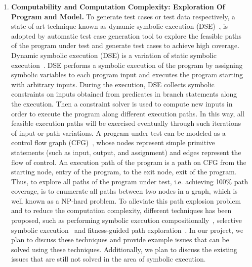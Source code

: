 \documentclass[times, 10pt,onecolumn]{article}
\begin{document}
\begin{enumerate}
\item{\textbf{Computability and Computation Complexity: Exploration Of Program and Model.} To generate test cases or test data respectively, a state-of-art technique known as dynamic symbolic execution (DSE)~\cite{dart,exe,cute}, is adopted by automatic test case generation tool to explore the feasible paths of the program under test and generate test cases to achieve high coverage. Dynamic symbolic execution (DSE) is a variation of static symbolic execution~\cite{static}. DSE performs a symbolic execution of the program by assigning symbolic variables to each program input and executes the program starting with arbitrary inputs. During the execution, DSE collects symbolic constraints on inputs obtained from predicates in branch statements along the execution. Then a constraint solver is used to compute new inputs in order to execute the program along different execution paths. In this way, all feasible execution paths will be exercised eventually through such iterations of input or path variations. A program under test can be modeled as a control flow graph (CFG)~\cite{testbook}, whose nodes represent simple primitive statements (such as input, output, and assignment) and edges represent the flow of control. An execution path of the program is a path on CFG from the starting node, entry of the program, to the exit node, exit of the program. Thus, to explore all paths of the program under test, i.e. achieving 100\% path coverage, is to enumerate all paths between two nodes in a graph, which is well known as a NP-hard problem. To alleviate this path explosion problem and to reduce the computation complexity, different techniques has been proposed, such as performing symbolic execution compositionally~\cite{compositional}, selective symbolic execution~\cite{selective} and fitness-guided path exploration~\cite{fitness}. In our project, we plan to discuss these techniques and provide example issues that can be solved using these techniques. Additionally, we plan to discuss the existing issues that are still not solved in the area of symbolic execution.}
\end{enumerate}



\end{document}
